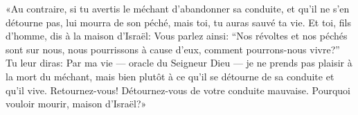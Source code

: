 «Au contraire, si tu avertis le méchant d’abandonner sa conduite,
		et qu’il ne s’en détourne pas,
	lui mourra de son péché, mais toi, tu auras sauvé ta vie.
Et toi, fils d’homme, dis à la maison d’Israël:
	Vous parlez ainsi: “Nos révoltes et nos péchés sont sur nous,
	nous pourrissons à cause d’eux, comment pourrons-nous vivre?”
Tu leur diras: Par ma vie --- oracle du Seigneur Dieu ---
	je ne prends pas plaisir à la mort du méchant,
	mais bien plutôt à ce qu’il se détourne de sa conduite et qu’il vive.
Retournez-vous! Détournez-vous de votre conduite mauvaise.
	Pourquoi vouloir mourir, maison d’Israël?»
